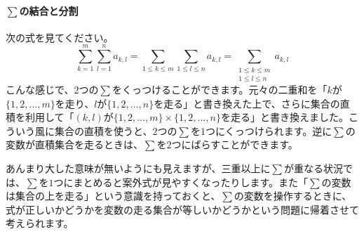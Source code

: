 \paragraph{$\sum$の結合と分割} 次の式を見てください。
\[
\sum_{k = 1}^m \sum_{l = 1}^n a_{k, l} = \sum_{1\leq k\leq m} \sum_{1\leq l\leq n} a_{k, l} = \sum_{\substack	{1\leq k \leq m\\ 1\leq l\leq n}} a_{k, l}
\]
こんな感じで、$2$つの$\sum$をくっつけることができます。元々の二重和を「$k$が$\{1,2,\ldots,m\}$を走り、$l$が$\{1,2,\ldots,n\}$を走る」と書き換えた上で、さらに集合の直積を利用して「$(k,l)$が$\{1,2,\ldots,m\}\times\{1,2,\ldots,n\}$を走る」と書き換えました。こういう風に集合の直積を使うと、$2$つの$\sum$を$1$つにくっつけられます。逆に$\sum$の変数が直積集合を走るときは、$\sum$を$2$つにばらすことができます。

あんまり大した意味が無いようにも見えますが、三重以上に$\sum$が重なる状況では、$\sum$を$1$つにまとめると案外式が見やすくなったりします。また「$\sum$の変数は集合の上を走る」という意識を持っておくと、$\sum$の変数を操作するときに、式が正しいかどうかを変数の走る集合が等しいかどうかという問題に帰着させて考えられます。

